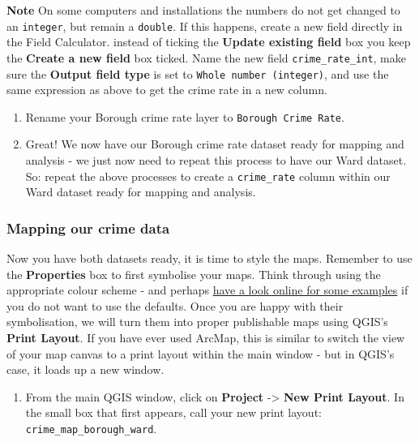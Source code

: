\documentclass[
]{book}
\providecommand{\tightlist}{%
  \setlength{\itemsep}{0pt}\setlength{\parskip}{0pt}}
\begin{document}
\textbf{Note}
On some computers and installations the numbers do not get changed to an \texttt{integer}, but remain a \texttt{double}. If this happens, create a new field directly in the Field Calculator. instead of ticking the \textbf{Update existing field} box you keep the \textbf{Create a new field} box ticked. Name the new field \texttt{crime\_rate\_int}, make sure the \textbf{Output field type} is set to \texttt{Whole\ number\ (integer)}, and use the same expression as above to get the crime rate in a new column.

\begin{enumerate}
\def\labelenumi{\arabic{enumi}.}
\setcounter{enumi}{11}
\item
  Rename your Borough crime rate layer to \texttt{Borough\ Crime\ Rate}.
\item
  Great! We now have our Borough crime rate dataset ready for mapping and analysis - we just now need to repeat this process to have our Ward dataset. So: repeat the above processes to create a \texttt{crime\_rate} column within our Ward dataset ready for mapping and analysis.
\end{enumerate}

\hypertarget{mapping-our-crime-data}{%
\subsubsection{Mapping our crime data}\label{mapping-our-crime-data}}

Now you have both datasets ready, it is time to style the maps. Remember to use the \textbf{Properties} box to first symbolise your maps. Think through using the appropriate colour scheme - and perhaps \href{https://colorbrewer2.org/\#type=sequential\&scheme=BuGn\&n=3}{have a look online for some examples} if you do not want to use the defaults. Once you are happy with their symbolisation, we will turn them into proper publishable maps using QGIS's \textbf{Print Layout}. If you have ever used ArcMap, this is similar to switch the view of your map canvas to a print layout within the main window - but in QGIS's case, it loads up a new window.

\begin{enumerate}
\def\labelenumi{\arabic{enumi}.}
\tightlist
\item
  From the main QGIS window, click on \textbf{Project} -\textgreater{} \textbf{New Print Layout}. In the small box that first appears, call your new print layout: \texttt{crime\_map\_borough\_ward}.
\end{enumerate}
\end{document}
